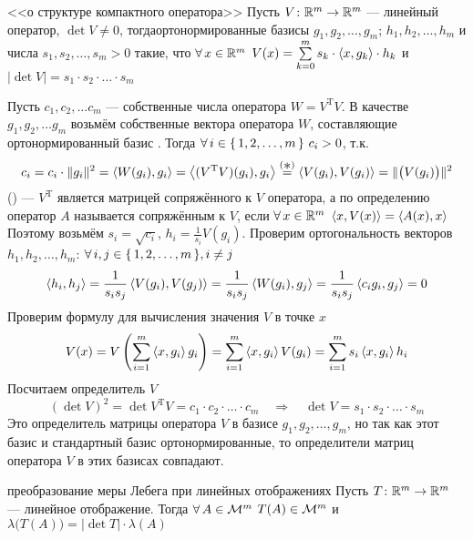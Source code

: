 \begin{lem}[https://www.youtube.com/live/Y10gq1j3ADI?si=-pbDvy1lH1-gYVgV&t=9992]{<<о структуре компактного оператора>>}\label{стр.комп.опер.}%
	Пусть $V \colon \mathbb R^m \to \mathbb R^m$ --- линейный оператор, $\det V \ne 0$, тогда\E ортонормированные базисы $g_1, g_2, \ldots, g_m$; $h_1, h_2, \ldots, h_m$ и числа $s_1, s_2, \ldots, s_m > 0$ такие, что $\forall \, x \in \mathbb R^m$ $V(x) = \sum\limits_{k = 0}^{m} s_k \cdot \left<x, g_k\right> \cdot h_k$ и $|\det V| = s_1 \cdot s_2 \cdot \ldots \cdot s_m$ 
\end{lem}

\begin{prf}
	Пусть $c_1, c_2, \ldots c_m$ --- собственные числа оператора $W = V^{\mathrm T}V$. В качестве $g_1, g_2, \ldots g_m$ возьмём собственные вектора оператора $W$, составляющие ортонормированный базис \rmm. Тогда $\forall \, i \in \{\,1, 2, \ldots, m\,\}\ c_i >0$, т.к.
	\[c_i = c_i \cdot \|g_i\|^2 = \scal{W(g_i), g_i} = \scal{(V^\mathrm T V)(g_i), g_i} \stackrel{(\raisebox{-1.5pt}{\large\textasteriskcentered})}{=} \scal{V(g_i), V(g_i)} = \|\bigl(V(g_i)\bigr)\|^2\]
	(\raisebox{-1pt}{\Large\textasteriskcentered}) --- $V^{\mathrm T}$ является матрицей сопряжённого к $V$ оператора, а по определению оператор $A$ называется сопряжённым к $V$, если $\forall \, x \in \mathbb R^m$ $\left<x, V(x)\right> = \left<A(x), x\right>$
	\\[5pt]
	Поэтому возьмём $s_i = \sqrt{c_i}$, $h_i = \frac {1}{s_i} V(g_i)$. Проверим ортогональность векторов $h_1, h_2, \ldots, h_m$: $\forall \, i, j \in \{\,1, 2, \ldots, m\,\}, i \ne j$
	\[\left<h_i, h_j\right> = \frac{1}{s_i s_j} \left<V(g_i), V(g_j)\right> = \frac{1}{s_i s_j} \left<W(g_i), g_j\right> = \frac{1}{s_i s_j} \left<c_i g_i, g_j\right> = 0\]
	Проверим формулу для вычисления значения $V$ в точке $x$
	\[V(x) = V\left(\sum_{i = 1}^m \left<x, g_i\right> g_i\right) = \sum_{i = 1}^m \left<x, g_i\right> V(g_i) = \sum_{i = 1}^m s_i \left<x, g_i\right> h_i\]
	Посчитаем определитель $V$
	\[(\det V)^2 = \det V^\mathrm T V = c_1 \cdot c_2 \cdot \ldots \cdot c_m \quad \Rightarrow \quad \det V = s_1 \cdot s_2 \cdot \ldots \cdot s_m\]
	Это определитель матрицы оператора $V$ в базисе $g_1, g_2, \ldots, g_m$, но так как этот базис и стандартный базис ортонормированные, то определители матриц оператора $V$ в этих базисах совпадают. 
\end{prf}

\begin{teor}[https://www.youtube.com/live/Y10gq1j3ADI?si=iW2xO121rYjf-JDV&t=11142]{преобразование меры Лебега при линейных отображениях}
	Пусть $T \colon \mathbb R^m \to \mathbb R^m$ --- линейное отображение. Тогда $\forall \, A \in \mathcal{M}^m$ $T(A) \in \mathcal{M}^m$ и $\lambda\bigl(T(A)\bigr) = |\det T| \cdot \lambda(A)$
\end{teor}

